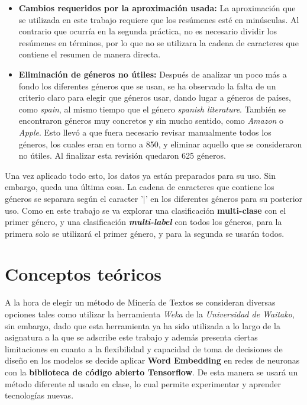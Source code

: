 \documentclass[12pt,a4paper, xcolor=table]{article}
\begin{document}
\begin{itemize}
            \item \textbf{Cambios requeridos por la aproximación usada:} La aproximación que se utilizada en este trabajo requiere que los resúmenes esté en minúsculas. Al contrario que ocurría en la segunda práctica, no es necesario dividir los resúmenes en términos, por lo que no se utilizara la cadena de caracteres que contiene el resumen de manera directa.
            \item \textbf{Eliminación de géneros no útiles:} Después de analizar un poco más a fondo los diferentes géneros que se usan, se ha observado la falta de un criterio claro para elegir que géneros usar, dando lugar a géneros de países, como \textit{spain}, al mismo tiempo que el género \textit{spanish literature}. También se encontraron géneros muy concretos y sin mucho sentido, como \textit{Amazon} o \textit{Apple}. Esto llevó a que fuera necesario revisar manualmente todos los géneros, los cuales eran en torno a 850, y eliminar aquello que se consideraron no útiles. Al finalizar esta revisión quedaron 625 géneros.
        \end{itemize}

    \vspace{3mm}

    Una vez aplicado todo esto, los datos ya están preparados para su uso. Sin embargo, queda una última cosa. La cadena de caracteres que contiene los géneros se separara según el caracter '$|$' en los diferentes géneros para su posterior uso. Como en este trabajo se va explorar una clasificación \textbf{multi-clase} con el primer género, y una clasificación \textit{\textbf{multi-label}} con todos los géneros, para la primera solo se utilizará el primer género, y para la segunda se usarán todos.

\newpage

\section{Conceptos teóricos}
A la hora de elegir un método de Minería de Textos se consideran diversas opciones tales como utilizar la herramienta \textit{Weka} de la \textit{Universidad de Waitako}, sin embargo, dado que esta herramienta ya ha sido utilizada a lo largo de la asignatura a la que se adscribe este trabajo y además presenta ciertas limitaciones en cuanto a la flexibilidad y capacidad de toma de decisiones de diseño en los modelos se decide aplicar \textbf{Word Embedding} en redes de neuronas con la \textbf{biblioteca de código abierto Tensorflow}. De esta manera se usará un método diferente al usado en clase, lo cual permite experimentar y aprender tecnologías nuevas.
\end{document}
